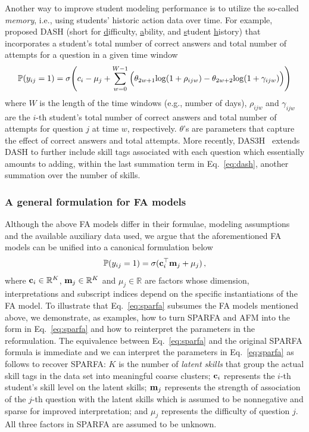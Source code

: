 Another way to improve student modeling performance is to utilize the so-called
\textit{memory}, i.e., using students' historic action data over time. For
example, ~\cite{lindsey2014improving,mozer2016predicting} proposed DASH (short
for \underline{d}ifficulty, \underline{a}bility, and \underline{s}tudent
\underline{h}istory) that incorporates a student's total number of correct
answers and total number of attempts for a question in a given time window
\begin{align} \label{eq:dash}
    \mathbb{P}(y_{ij}=1)  = \sigma\Bigg( c_i - \mu_j + \sum_{w=0}^{W-1} \Big(\theta_{2w+1}{\rm log}(1+\rho_{ijw}) - \theta_{2w+2}{\rm log}(1+\gamma_{ijw})\Big) \Bigg)
\end{align}
where $W$ is the length of the time windows (e.g., number of days), $\rho_{ijw}$ and $\gamma_{ijw}$ are the $i$-th student's total number of correct answers and total number of attempts for question $j$ at time $w$, respectively. $\theta$'s are parameters that capture the effect of correct answers and total attempts. More recently, DAS3H~\cite{das3h} extends DASH to further include skill tags associated with each question which essentially amounts to adding, within the last summation term in Eq.~\ref{eq:dash}, another summation over the number of skills.

\subsubsection{A general formulation for FA models}
Although the above FA models differ in their formulae, modeling assumptions and
the available auxiliary data used, we argue that the aforementioned FA models
can be unified into a canonical formulation below
\begin{align}
    \begin{split}
        \mathbb{P}(y_{ij}=1) = \sigma({\mathbf{c}}_i^\top {\mathbf{m}}_j + \mu_j)\,, \label{eq:sparfa}
    \end{split}
\end{align}
where ${\mathbf{c}}_i\in\mathbb{R}^K$, ${\mathbf{m}}_j\in\mathbb{R}^K$ and $\mu_j\in\mathbb{R}$ are factors whose dimension, interpretations and subscript indices depend on the specific instantiations of the FA model. To illustrate that Eq.~\ref{eq:sparfa} subsumes the FA models mentioned above, we demonstrate, as examples, how to turn SPARFA and AFM into the form in Eq.~\ref{eq:sparfa} and how to reinterpret the parameters in the reformulation. The equivalence between Eq.~\ref{eq:sparfa} and the original SPARFA formula is immediate and we can interpret the parameters in Eq.~\ref{eq:sparfa} as follows to recover SPARFA: $K$ is the number of \textit{latent skills} that group the actual skill tags in the data set into meaningful coarse clusters; ${\mathbf{c}}_i$ represents the $i$-th student's skill level on the latent skills; ${\mathbf{m}}_j$ represents the strength of association of the $j$-th question with the latent skills which is assumed to be nonnegative and sparse for improved interpretation; and $\mu_j$ represents the difficulty of question $j$. All three factors in SPARFA are assumed to be unknown.

